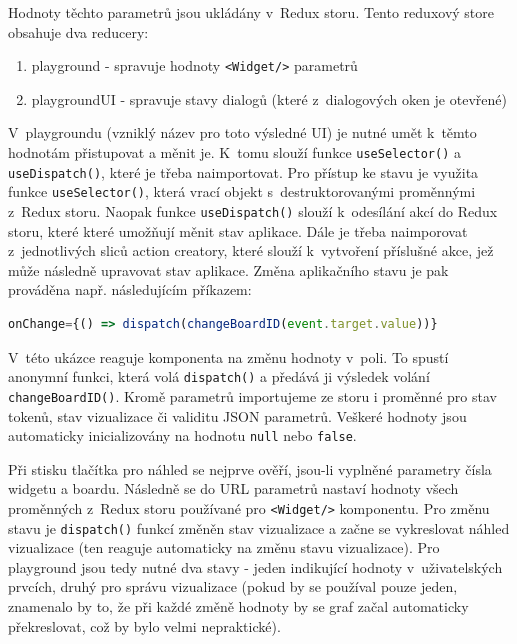 \documentclass[czech, bc, kiv, he, iso690numb]{fasthesis}
\begin{document}
Hodnoty těchto parametrů jsou ukládány v~Redux storu. Tento reduxový store obsahuje dva reducery: 

\begin{enumerate}
	\item playground - spravuje hodnoty \texttt{<Widget/>} parametrů 
	\item playgroundUI - spravuje stavy dialogů (které z~dialogových oken je otevřené)
\end{enumerate}

V~playgroundu (vzniklý název pro toto výsledné UI) je nutné umět k~těmto hodnotám přistupovat a měnit je. K~tomu slouží funkce \texttt{useSelector()} a \texttt{useDispatch()},
které je třeba naimportovat. Pro přístup ke stavu je využita funkce \texttt{useSelector()}, která vrací objekt s~destruktorovanými proměnnými z~Redux storu. Naopak funkce 
\texttt{useDispatch()} slouží k~odesílání akcí do Redux storu, které které umožňují měnit stav aplikace. Dále je třeba naimporovat z~jednotlivých sliců action creatory, které
slouží k~vytvoření příslušné akce, jež může následně upravovat stav aplikace. Změna aplikačního stavu je pak prováděna např. následujícím příkazem:

\begin{lstlisting}[language=Javascript]
onChange={() => dispatch(changeBoardID(event.target.value))}
\end{lstlisting}

V~této ukázce reaguje komponenta na změnu hodnoty v~poli. To spustí anonymní funkci, která volá \texttt{dispatch()} a předává ji výsledek volání \texttt{changeBoardID()}. Kromě parametrů
importujeme ze storu i proměnné pro stav tokenů, stav vizualizace či validitu JSON parametrů. Veškeré hodnoty jsou automaticky inicializovány na hodnotu \texttt{null} nebo \texttt{false}.

Při stisku tlačítka pro náhled se nejprve ověří, jsou-li vyplněné parametry čísla widgetu a boardu. Následně se do URL parametrů nastaví hodnoty všech proměnných z~Redux storu
používané pro \texttt{<Widget/>} komponentu. Pro změnu stavu je \texttt{dispatch()} funkcí změněn stav vizualizace a začne se vykreslovat náhled vizualizace (ten reaguje automaticky
na změnu stavu vizualizace). Pro playground jsou tedy nutné dva stavy - jeden indikující hodnoty v~uživatelských prvcích, druhý pro správu vizualizace (pokud by se používal pouze jeden,
znamenalo by to, že při každé změně hodnoty by se graf začal automaticky překreslovat, což by bylo velmi nepraktické).
\end{document}
